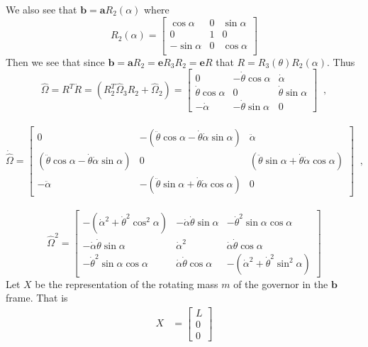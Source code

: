 \documentclass[graybox,envcountchap,sectrefs]{svmonoMuga}
\begin{document}
We also see that $\mathbf{b}=\mathbf{a}R_2(\alpha)$ where
\[
  R_2(\alpha)= 
  \left[\begin{matrix}
  \cos\alpha & 0 & \sin\alpha \\
  0 & 1 & 0 \\
  -\sin\alpha & 0 & \cos\alpha\\
  \end{matrix}\right]
\]
Then we see that since $\mathbf{b}=\mathbf{a}R_2=\mathbf{e}R_3R_2=\mathbf{e}R$ that $R=R_3(\theta)R_2(\alpha)$.
Thus
\[
\widehat{\Omega}=R^T\dot{R}=(R_2^T\widehat{\Omega}_3R_2+\widehat{\Omega}_2)=\begin{bmatrix}
0 &-\dot{\theta}\cos\alpha & \dot{\alpha}\\
\dot{\theta}\cos\alpha & 0 & \dot{\theta}\sin\alpha \\
-\dot{\alpha} & -\dot{\theta}\sin\alpha & 0
\end{bmatrix} \;\;,\]\\

\[
\dot{\widehat{\Omega}}=\begin{bmatrix}
0 &-(\ddot{\theta}\cos\alpha-\dot{\theta}\dot{\alpha}\sin\alpha) & \ddot{\alpha}
\\
(\ddot{\theta}\cos\alpha-\dot{\theta}\dot{\alpha}\sin\alpha) & 0 & 
(\ddot{\theta}\sin\alpha+\dot{\theta}\dot{\alpha}\cos\alpha) \\
-\ddot{\alpha} & -(\ddot{\theta}\sin\alpha+\dot{\theta}\dot{\alpha}\cos\alpha) & 0
\end{bmatrix} \;\;,\]\\
\[
\widehat{\Omega}^2=\begin{bmatrix}-(\dot{\alpha}^2+\dot{\theta}^2\cos^2\alpha) &  -\dot{\alpha}\dot{\theta}\sin{\alpha} & -\dot{\theta}^2\sin{\alpha}\cos{\alpha}\\
-\dot{\alpha}\dot{\theta}\sin{\alpha} & \dot{\alpha}^2 &       \dot{\alpha}\dot{\theta}\cos{\alpha}\\
-\dot{\theta}^2\sin{\alpha}\cos{\alpha} & \dot{\alpha}\dot{\theta}\cos{\alpha} & - (\dot{\alpha}^2+\dot{\theta}^2\sin^2{\alpha})\end{bmatrix}
\]
Let $X$ be the representation of the rotating mass $m$ of the governor in the $\mathbf{b}$ frame. That is
\begin{align*}
X&= \left[\begin{matrix}
  L \\
  0\\
  0
 \end{matrix}\right]
\end{align*}
\end{document}
